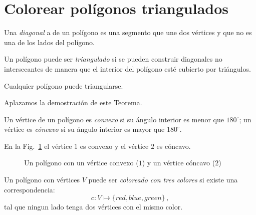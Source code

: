 \section{Colorear polígonos triangulados}\label{s.museum-triangulating}

\begin{definition}
Una \emph{diagonal} a de un polígono es una segmento que une dos vértices y que no es una de los lados del polígono.
\end{definition}

\begin{definition}
Un polígono puede ser \emph{triangulado} si se pueden construir diagonales no intersecantes de manera que el interior del polígono esté cubierto por triángulos.
\end{definition}

\begin{theorem}
Cualquier polígono puede triangularse.\label{thm.tri}
\end{theorem}
Aplazamos la demostración de este Teorema.
\begin{definition}
Un vértice de un polígono es \emph{convexo} si su ángulo interior es menor que $180^\circ$; un vértice es \emph{cóncavo} si su ángulo interior es mayor que $180^\circ$. 
\end{definition}
En la Fig.~\ref{f.museum.arbitrary} el vértice $1$ es convexo y el vértice $2$ es cóncavo.

\begin{figure}[ht]
\begin{center}
\end{center}
\caption{Un polígono con un vértice convexo ($1$) y un vértice cóncavo ($2$)}\label{f.museum.arbitrary}
\end{figure}

\begin{definition}
Un polígono con vértices $V$ puede ser \emph{coloreado con tres colores} si existe una correspondencia:
\[c: V \mapsto \{\mathit{red},\mathit{blue},\mathit{green}\}\,,\]
tal que ningun lado tenga dos vértices con el mismo color.
\end{definition}

